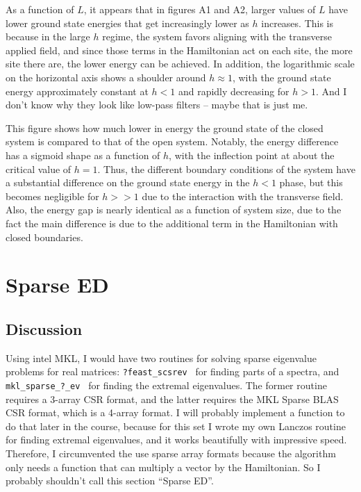 \documentclass{article}
\begin{document}
As a function of $L$, it appears that in figures A1 and A2, larger values of $L$
have lower ground state energies that get increasingly lower as $h$ increases.
This is because in the large $h$ regime, the system favors aligning with the
transverse applied field, and since those terms in the Hamiltonian act on each site,
the more site there are, the lower energy can be achieved.
In addition, the logarithmic scale on the horizontal axis shows a shoulder around 
$h\approx 1$, with the ground state energy approximately constant at $h<1$ and
rapidly decreasing for $h>1$.
And I don't know why they look like low-pass filters -- maybe that is just me.

\begin{figure}[h]

\end{figure}

This figure shows how much lower in energy the ground state of the closed system
is compared to that of the open system.
Notably, the energy difference has a sigmoid shape as a function of $h$,
with the inflection point at about the critical value of $h=1$.
Thus, the different boundary conditions of the system have a substantial difference
on the ground state energy in the $h<1$ phase, but this becomes negligible for $h>>1$
due to the interaction with the transverse field.
Also, the energy gap is nearly identical as a function of system size, due to the fact
the main difference is due to the additional term in the Hamiltonian with closed boundaries.

\newpage

\section{
Sparse ED
}

\subsection{
Discussion
}

Using intel MKL, I would have two routines for solving
sparse eigenvalue problems for real matrices:
{\tt ?feast\_scsrev } for finding parts of a spectra, and
{\tt mkl\_sparse\_?\_ev } for finding the extremal eigenvalues.
The former routine requires a 3-array CSR format, and the latter
requires the MKL Sparse BLAS CSR format, which is a 4-array format.
I will probably implement a function to do that later in the course,
because for this set I wrote my own Lanczos routine for finding extremal
eigenvalues, and it works beautifully with impressive speed.
Therefore, I circumvented the use sparse array formats because the algorithm
only needs a function that can multiply a vector by the Hamiltonian.
So I probably shouldn't call this section ``Sparse ED''.
\end{document}
